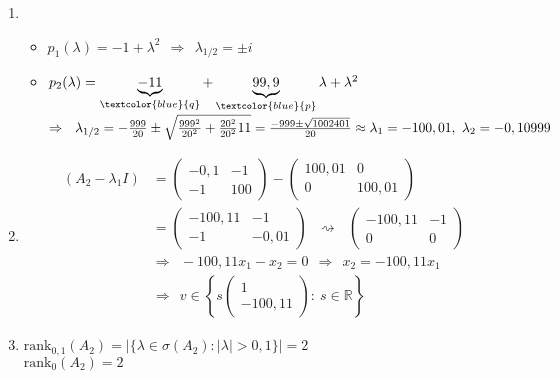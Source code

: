 {\color{solution}
\begin{enumerate}
	\item \begin{itemize}
		\item $p_1(\lambda) = -1+\lambda^2~~\Rightarrow~~\lambda_{1/2} =\pm i$
		\item $p_2(\lambda)=\underbrace{-11}_{\textcolor{blue}{q}}+\underbrace{99,9}_{\textcolor{blue}{p}}\lambda +\lambda^2$\\ $\Rightarrow~~\lambda_{1/2}=-\frac{999}{20}\pm\sqrt{\frac{999^2}{20^2}+\frac{20^2}{20^2}11}=\frac{-999\pm\sqrt{1002401}}{20}\\\approx\lambda_1=-100,01,~\lambda_2=-0,10999$
	\end{itemize}
	\item \begin{align*} (A_2-\lambda_1 I)&=\begin{pmatrix} -0,1&-1\\-1&100\end{pmatrix}-\begin{pmatrix}100,01&0\\0&100,01\end{pmatrix}\\&=\begin{pmatrix}-100,11&-1\\-1&-0,01\end{pmatrix}~~~\rightsquigarrow~~~\begin{pmatrix}-100,11&-1\\0&0\end{pmatrix}\\&\Rightarrow~~-100,11x_1-x_2=0~~\Rightarrow~~x_2=-100,11x_1\\&\Rightarrow~~v\in\left\lbrace s\begin{pmatrix}1\\-100,11\end{pmatrix}:~s\in\mathbb{R}\right\rbrace\end{align*}
	\item $\text{rank}_{0,1}(A_2) =|\{\lambda\in\sigma(A_2):|\lambda|>0,1\}|=2$\\$\text{rank}_0(A_2)=2$
\end{enumerate}
}